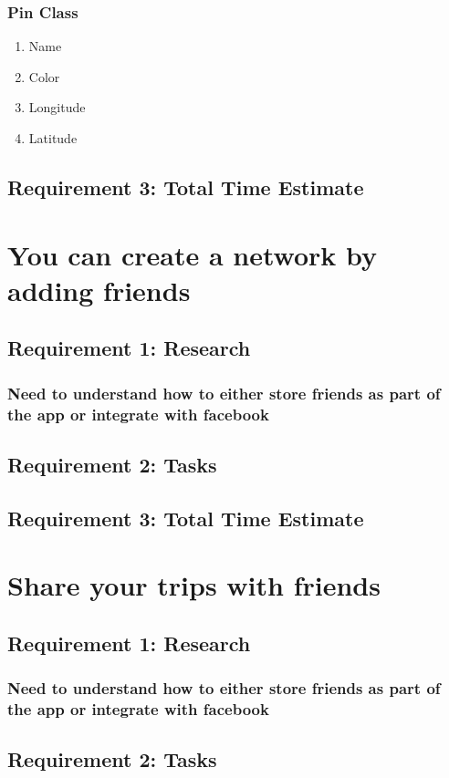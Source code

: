 \documentclass [10pt] {article}
\begin{document}
\subsubsection{Pin Class}
\begin{enumerate}
\item Name
\item Color
\item Longitude
\item Latitude
\end{enumerate}
\subsection{Requirement 3: Total Time Estimate}


\section{You can create a network by adding friends}
\subsection{Requirement 1: Research}
\subsubsection{Need to understand how to either store friends as part of the app or integrate with facebook}
\subsection{Requirement 2: Tasks}
\subsection{Requirement 3: Total Time Estimate}


\section{Share your trips with friends}
\subsection{Requirement 1: Research}
\subsubsection{Need to understand how to either store friends as part of the app or integrate with facebook}
\subsection{Requirement 2: Tasks}
\end{document}
